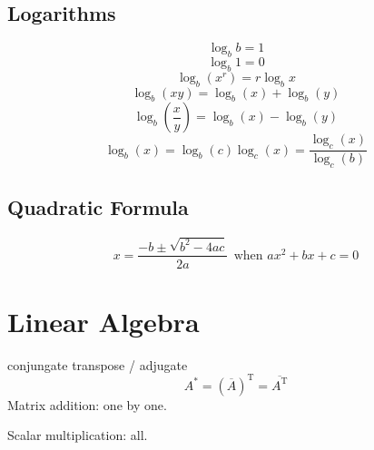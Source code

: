 \documentclass{article}
\begin{document}
	\subsection{Logarithms}	
		\begin{equation}
			\log _b b = 1
		\end{equation}
		\begin{equation}
			\log _b 1 = 0
		\end{equation}
		\begin{equation}
			\log _b (x^r) = r \log _b x
		\end{equation}
		\begin{equation}
			\log _b (xy) = \log _b (x) + \log _b (y)
		\end{equation}
		\begin{equation}
			\log _b \left( \frac{x}{y} \right) = \log _b (x) - \log _b (y)
		\end{equation}
		\begin{equation}
			\log _b \left( x \right) = \log _b \left( c \right)\log _c \left( x \right) = \frac{{\log _c \left( x \right)}}{{\log _c \left( b \right)}}
		\end{equation}
	\subsection{Quadratic Formula}
		\begin{equation}
			x = \frac{{ - b \pm \sqrt {b^2 - 4ac} }}{{2a}} \ \ \mbox{when $ax^2 + bx + c = 0$}
		\end{equation}
\section{Linear Algebra}
	conjungate transpose / adjugate 
	\begin{equation}
		A^* = (\overline{A})^\mathrm{T} = \overline{A^\mathrm{T}}
	\end{equation}
	Matrix addition: one by one.
	
	Scalar multiplication: all. 
\end{document}
